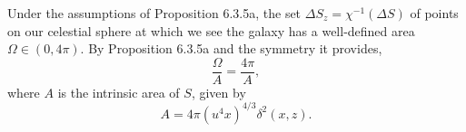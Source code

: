 Under the assumptions of Proposition 6.3.5a, the set $\Delta S_z = \chi^{-1}(\Delta S)$ of points on our celestial sphere at which we see the galaxy has a well-defined area $\Omega \in (0, 4\pi)$. By Proposition 6.3.5a and the symmetry it provides,
$$\frac{\Omega}{A} = \frac{4\pi}{A},$$
where $A$ is the intrinsic area of $S$, given by
$$A = 4\pi (u^4 x)^{4/3} \delta^2(x, z).$$
